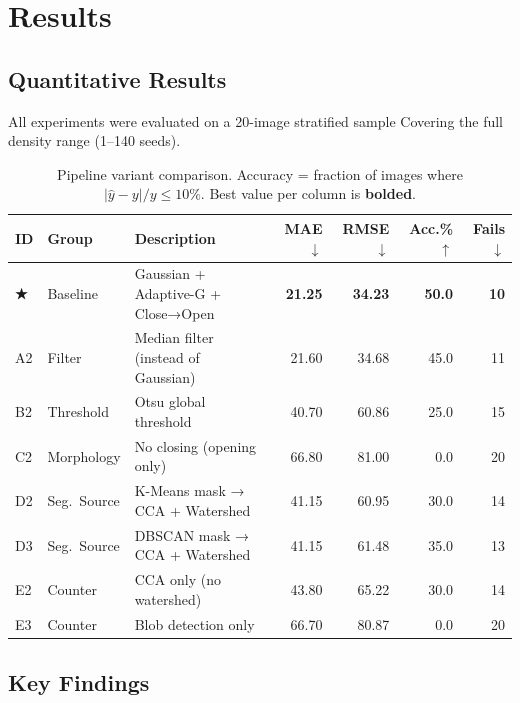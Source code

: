 \documentclass[12pt,a4paper]{article}
\begin{document}
\section{Results}
\label{sec:results}

\subsection{Quantitative Results}

All experiments were evaluated on a 20-image stratified sample Covering the
full density range (1--140 seeds).

\begin{table}[H]
\centering
\caption{Pipeline variant comparison. Accuracy = fraction of images where
$|\hat{y} - y| / y \leq 10\%$. Best value per column is \textbf{bolded}.}
\label{tab:results}
\renewcommand{\arraystretch}{1.25}
\begin{tabular}{l l l r r r r}
\toprule
\textbf{ID} & \textbf{Group} & \textbf{Description} & \textbf{MAE} $\downarrow$ & \textbf{RMSE} $\downarrow$ & \textbf{Acc.\%} $\uparrow$ & \textbf{Fails} $\downarrow$ \\
\midrule
\textbf{★} & Baseline & Gaussian + Adaptive-G + Close→Open & \textbf{21.25} & \textbf{34.23} & \textbf{50.0} & \textbf{10} \\
\midrule
A2 & Filter    & Median filter (instead of Gaussian) & 21.60 & 34.68 & 45.0 & 11 \\
B2 & Threshold & Otsu global threshold               & 40.70 & 60.86 & 25.0 & 15 \\
C2 & Morphology & No closing (opening only)          & 66.80 & 81.00 & 0.0  & 20 \\
\midrule
D2 & Seg.\ Source & K-Means mask → CCA + Watershed  & 41.15 & 60.95 & 30.0 & 14 \\
D3 & Seg.\ Source & DBSCAN mask → CCA + Watershed   & 41.15 & 61.48 & 35.0 & 13 \\
\midrule
E2 & Counter  & CCA only (no watershed)              & 43.80 & 65.22 & 30.0 & 14 \\
E3 & Counter  & Blob detection only                  & 66.70 & 80.87 & 0.0  & 20 \\
\bottomrule
\end{tabular}
\end{table}

\subsection{Key Findings}
\end{document}
